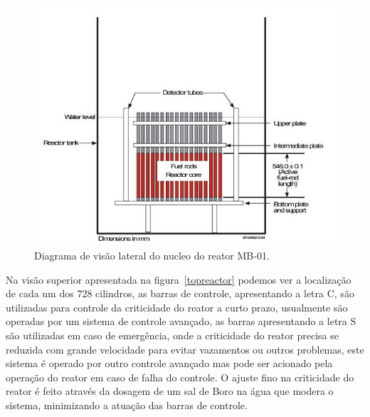 \documentclass[
	12pt,				%
	openany,			%
	twoside,			%
	a4paper,			%
	english,			%
	french,				%
	spanish,			%
	brazil				%
	]{abntex2}
\begin{document}
\begin{figure}[htpb]
	\caption{\label{sidecore}Diagrama de visão lateral do nucleo do reator MB-01.}
	\begin{center}
	    \includegraphics[scale=1]{figs/Core_Side}
	\end{center}
\end{figure}

Na visão superior apresentada na figura~\ref{topreactor} podemos ver a localização
de cada um dos 728 cilindros, as barras de controle, apresentando
a letra C, são utilizadas para controle da criticidade do reator a
curto prazo, usualmente são operadas por um sistema de controle avançado,
as barras apresentando a letra S são utilizadas em caso de emergência,
onde a criticidade do reator precisa se reduzida com grande velocidade
para evitar vazamentos ou outros problemas, este sistema é operado
por outro controle avançado mas pode ser acionado pela operação do
reator em caso de falha do controle. O ajuste fino na criticidade
do reator é feito através da dosagem de um sal de Boro na água que
modera o sistema, minimizando a atuação das barras de controle.
\end{document}
